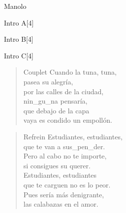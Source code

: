 \begin{song}{Manolo}
\begin{instrumental}{Intro A}[4]
\measure{}\measure{}
\measure{}
\end{instrumental}

\begin{instrumental}{Intro B}[4]
\measure{}\measure{}
\measure{}
\end{instrumental}

\begin{instrumental}{Intro C}[4]
\measure{}
\measure{}
\measure{}
\measure{}
\end{instrumental}

\begin{verse}{Couplet}
Cuando la tuna, tuna,\\
pasea su alegría,\\
por las calles de la ciudad,\\
nin\_gu\_na pensaría,\\
que debajo de la capa\\
vaya es condido un empollón.
\end{verse}
\begin{verse}{Refrein}
Estudiantes, estudiantes,\\
que te van a sus\_pen\_der.\\
\chord{}Pero al cabo no te importe,\\
si consigues su querer.\\
\vspace{1em}
Estudiantes, estudiantes\\
que te carguen no es lo peor.\\
Pues sería \hspace{0.5em}\hspace{2em} más denigrante,\hspace{1em}\\
las calabazas\hspace{0.5em}\hspace{2em} en el amor.\hspace{1em}\hspace{2em}
\end{verse}
\end{song}

